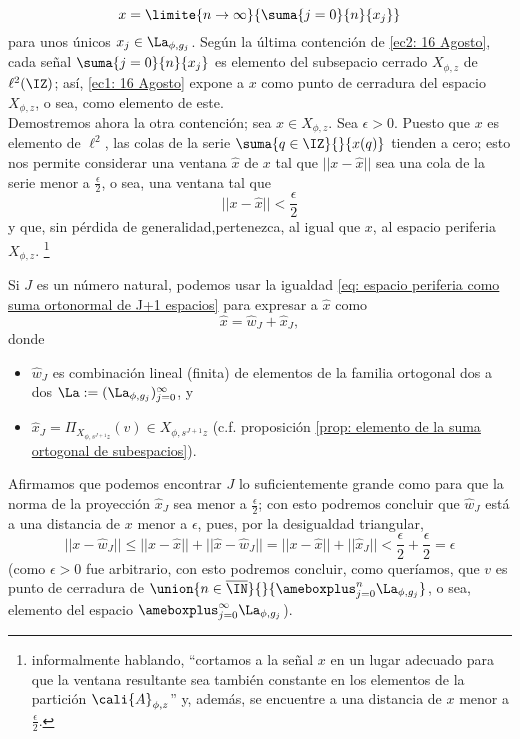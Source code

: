 \begin{equation} \label{ec1: 16 Agosto}
x = \limite{n \rightarrow \infty }{\suma{j=0}{n}{x_{j}}}
\end{equation}
para unos únicos
$x_{j} \in \La_{\phi,g_{j}}$.
Según la última contención de 
\eqref{ec2: 16 Agosto}, cada
señal $\suma{j=0}{n}{x_{j}}$ es elemento del 
subsepacio cerrado $X_{\phi,z}$ de $\ell^{2}(\IZ)$;
así, \eqref{ec1: 16 Agosto} expone a $x$ como punto 
de cerradura del espacio $X_{\phi,z}$, o sea, como elemento de este.\\

Demostremos ahora la otra contención; sea
$x \in X_{\phi,z}$. Sea 
$\epsilon >0$.
Puesto que $x$ es elemento de $\ell^{2}$, las colas
de la serie $\suma{q \in \IZ}{}{x(q)}$ tienden a cero;
esto nos permite considerar una ventana $\hat{x}$ de $x$
tal que $||x- \hat{x} ||$ sea una cola de la serie menor
a $\frac{\epsilon}{2}$, o sea, una ventana tal que
\[
||x- \hat{x} || < \frac{\epsilon}{2}
\]
y que, sin pérdida de generalidad,pertenezca,
al igual que $x$, al espacio
periferia $X_{\phi,z}$.
\footnote{informalmente hablando, ``cortamos a
la señal $x$ en un lugar adecuado para que la ventana resultante
sea también constante en los elementos de la partición $\cali{A}_{\phi,z}$''
y, además, se encuentre a una distancia de $x$ menor a $\frac{\epsilon}{2}$.}

Si $J$ es un número natural,
podemos usar la igualdad
\eqref{eq: espacio periferia como suma ortonormal de J+1 espacios} 
para expresar a $\hat{x}$ como
\[
\hat{x} = \hat{w}_{J} + \hat{x}_{J},
\]
donde
\begin{itemize}
\item $\hat{w}_{J}$ es combinación lineal (finita) de elementos 
de la familia 
ortogonal dos a dos $\La:=(\La_{\phi, g_{j}})_{j=0}^{\infty}$, y
\item $\hat{x}_{J} = \Pi_{X_{\phi, s^{J+1}z}}(v) \in X_{\phi, s^{J+1}z}$ 
(c.f. proposición \ref{prop: elemento de la suma ortogonal de subespacios}).
\end{itemize}
Afirmamos que podemos encontrar $J$ lo suficientemente grande
como para que la norma de la proyección $ \hat{x}_{J} $ sea menor
a $\frac{\epsilon}{2}$; con esto podremos concluir que $\hat{w}_{J}$
está a una distancia de $x$ menor a $\epsilon$, pues, por
la desigualdad triangular,
\[
||x- \hat{w}_{J} || \leq  ||x- \hat{x} || + || \hat{x} - \hat{w}_{J} ||
=  ||x- \hat{x} || + || \hat{x}_{J}|| < \frac{\epsilon}{2} + \frac{\epsilon}{2} 
= \epsilon
\]
(como $\epsilon >0$ fue arbitrario, con esto podremos concluir,
como queríamos, que
$v$ es punto de cerradura de 
$\union{n \in \overline{\IN}}{}{\ameboxplus_{j=0}^{n} \La_{\phi,g_{j}}}$, o sea, elemento
del espacio $\ameboxplus_{j = 0}^{\infty} \La_{\phi,g_{j}}$). \\

